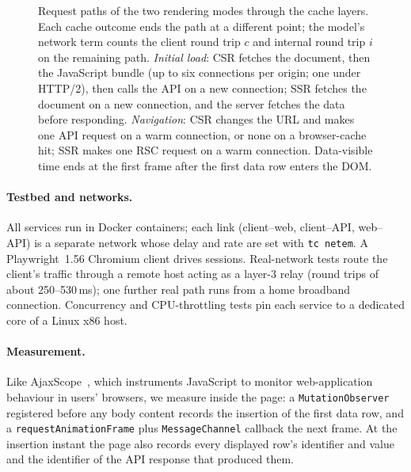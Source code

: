 \documentclass[acmsmall,review,nonacm]{acmart}
\begin{document}
\begin{figure}[t]
\centering
\resizebox{\textwidth}{!}{}
\caption{Request paths of the two rendering modes through the cache layers. Each cache outcome ends the path at a different point; the model's network term counts the client round trip $c$ and internal round trip $i$ on the remaining path. \emph{Initial load}: CSR fetches the document, then the JavaScript bundle (up to six connections per origin; one under HTTP/2), then calls the API on a new connection; SSR fetches the document on a new connection, and the server fetches the data before responding. \emph{Navigation}: CSR changes the URL and makes one API request on a warm connection, or none on a browser-cache hit; SSR makes one RSC request on a warm connection. Data-visible time ends at the first frame after the first data row enters the DOM.}
\label{fig:arch}
\end{figure}

\paragraph{Testbed and networks.}
All services run in Docker containers; each link (client--web, client--API, web--API) is a separate network whose delay and rate are set with \texttt{tc netem}. A Playwright~1.56 Chromium client drives sessions. Real-network tests route the client's traffic through a remote host acting as a layer-3 relay (round trips of about 250--530\,ms); one further real path runs from a home broadband connection. Concurrency and CPU-throttling tests pin each service to a dedicated core of a Linux x86 host.

\paragraph{Measurement.}
Like AjaxScope~\cite{kiciman2010ajaxscope}, which instruments JavaScript to monitor web-application behaviour in users' browsers, we measure inside the page: a \texttt{MutationObserver} registered before any body content records the insertion of the first data row, and a \texttt{requestAnimationFrame} plus \texttt{MessageChannel} callback the next frame. At the insertion instant the page also records every displayed row's identifier and value and the identifier of the API response that produced them.
\end{document}
